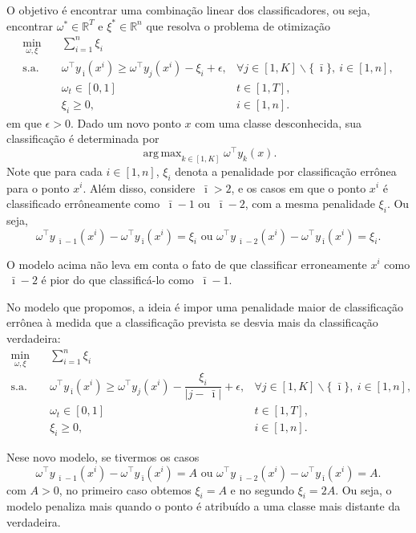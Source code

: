 \documentclass[a4,11pt]{article}
\newcommand{\st}{\text{s.a.}}
\newcommand{\classi}{\:\!\bar{\imath}}
\DeclareMathOperator*{\argmax}{arg\,max}
\begin{document}
O objetivo é encontrar uma combinação linear dos classificadores, ou seja, encontrar \( \omega^* \in \mathbb{R}^{T}\) e $\xi^* \in \mathbb{R}^n$ que resolva o problema de otimização
    \begin{align*}
      \min_{\omega,\xi} \quad
      &  \sum_{i=1}^n \xi_i 
      \\
      \st \quad
      & \omega^\top y_{\classi}(x^i) \geq  \displaystyle \omega^\top y_{j}(x^i) -  \xi_i + \epsilon,   &\forall  j \in [1,K]\backslash \{\classi\},\ i \in [1,n],\\
      &  \omega_t \in [0,1] & t \in [1,T], \\
      &   \xi_i \geq 0, & i \in [1,n].
    \end{align*}
em que $\epsilon > 0$.
Dado um novo ponto $x$ com uma classe desconhecida, sua classificação é determinada por
$$\argmax_{k\in [1,K]} \omega^\top y_{k}(x).$$
Note que para cada $i \in [1,n]$, $\xi_i$ denota a penalidade por classificação errônea para o ponto  $x^i$. Além disso, considere $\classi > 2$, e os casos em que o ponto $x^i$ é classificado errôneamente como $\classi -1 $ ou $\classi -2$, com a mesma penalidade $\xi_i$. Ou seja,
 $$\omega^\top y_{\classi -1 }(x^i) - \omega^\top y_{\classi  }(x^i) = \xi_i \text{ ou }\omega^\top y_{\classi -2 }(x^i) - \omega^\top y_{\classi  }(x^i) = \xi_i.$$
 
O modelo acima não leva em conta o fato de que classificar erroneamente $x^i$ como $\classi -2$ é pior do que classificá-lo como $\classi -1$. 

No modelo que propomos, a ideia é impor uma penalidade maior de classificação errônea à medida que a classificação prevista se desvia mais da classificação verdadeira:
\begin{align*}
    \min_{\omega,\xi} \quad
    &  \sum_{i=1}^n \xi_i 
    \\
    \st \quad
    & \omega^\top y_{\classi}(x^i) \geq  \displaystyle \omega^\top y_{j}(x^i) -  \dfrac{\xi_i}{\vert j- \classi \vert} + \epsilon,   &\forall  j \in [1,K]\backslash \{\classi\},\ i \in [1,n],\\
    &  \omega_t \in [0,1] & t \in [1,T], \\
    &   \xi_i \geq 0, & i \in [1,n].
\end{align*}

Nese novo modelo, se tivermos os casos
 $$\omega^\top y_{\classi-1 }(x^i) - \omega^\top y_{\classi  }(x^i) = A \text{ ou }\omega^\top y_{\classi -2 }(x^i) - \omega^\top y_{\classi  }(x^i) = A.$$
com $A>0$, no primeiro caso obtemos $\xi_i = A $ e no segundo $\xi_i = 2A$. Ou seja, o modelo penaliza mais quando o ponto é atribuído a uma classe mais distante da verdadeira. 

 



\end{document}
